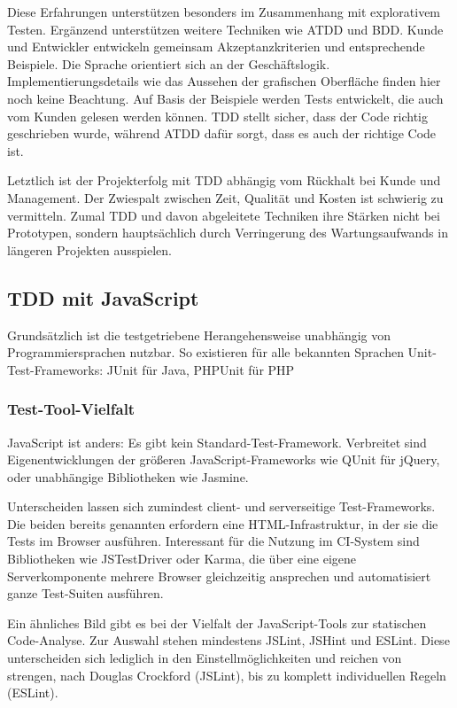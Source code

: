 Diese Erfahrungen unterstützen besonders im Zusammenhang mit explorativem Testen. Ergänzend unterstützen weitere Techniken wie \ac{ATDD} und \ac{BDD}. Kunde und Entwickler entwickeln gemeinsam Akzeptanzkriterien und entsprechende Beispiele. Die Sprache orientiert sich an der Geschäftslogik. Implementierungsdetails wie das Aussehen der grafischen Oberfläche finden hier noch keine Beachtung. Auf Basis der Beispiele werden Tests entwickelt, die auch vom Kunden gelesen werden können.{ }\ac{TDD} stellt sicher, dass der Code richtig geschrieben wurde, während ATDD dafür sorgt, dass es auch der richtige Code ist.

Letztlich ist der Projekterfolg mit \ac{TDD} abhängig vom Rückhalt bei Kunde und Management. Der Zwiespalt zwischen Zeit, Qualität und Kosten ist schwierig zu vermitteln. Zumal \ac{TDD} und davon abgeleitete Techniken ihre Stärken nicht bei Prototypen, sondern hauptsächlich durch Verringerung des Wartungsaufwands in längeren Projekten ausspielen.

\subsection{TDD mit JavaScript}
\label{sec:tddjs}
Grundsätzlich ist die testgetriebene Herangehensweise unabhängig von Programmiersprachen nutzbar. So existieren für alle bekannten Sprachen Unit-Test-Frameworks:  JUnit für Java, PHPUnit für PHP \usw

\subsubsection{Test-Tool-Vielfalt}
JavaScript ist anders: Es gibt kein Standard-Test-Framework. Verbreitet sind Eigenentwicklungen der größeren JavaScript-Frameworks wie QUnit für jQuery, oder unabhängige Bibliotheken wie Jasmine.

Unterscheiden lassen sich zumindest client- und serverseitige Test-Frame\-works. Die beiden bereits genannten erfordern eine HTML-Infrastruktur, in der sie die Tests im Browser ausführen. Interessant für die Nutzung im \ac{CI}-System sind Bibliotheken wie JSTestDriver oder Karma, die über eine eigene Serverkomponente mehrere Browser gleichzeitig ansprechen und automatisiert ganze Test-Suiten ausführen.

Ein ähnliches Bild gibt es bei der Vielfalt der JavaScript-Tools zur statischen Code-Analyse. Zur Auswahl stehen mindestens JSLint, JSHint und ESLint. Diese unterscheiden sich lediglich in den Einstellmöglichkeiten und reichen von strengen, nach Douglas Crockford (JSLint), bis zu komplett individuellen Regeln (ESLint).

